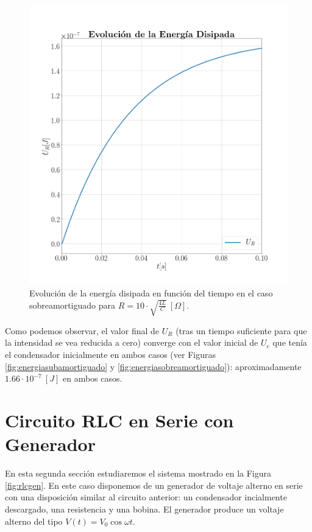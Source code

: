 \documentclass[journal]{IEEEtran}
\begin{document}
\begin{figure}[!htb]
    \centering
    \includegraphics[width=\linewidth,trim={40 70 70 70},clip]{energiadisipadasobreamortiguado.png}
    \caption{Evolución de la energía disipada en función del tiempo en el caso sobreamortiguado para $R=10 \cdot\sqrt{\frac{4L}{C}}~[\Omega]$.}
    \label{fig:energiadisipadasobreamortiguado}
\end{figure}

Como podemos observar, el valor final de $U_R$ (tras un tiempo suficiente para que la intensidad se vea reducida a cero) converge con el valor inicial de $U_e$ que tenía el condensador inicialmente en ambos casos (ver Figuras \ref{fig:energiasubamortiguado} y \ref{fig:energiasobreamortiguado}): aproximadamente $1.66\cdot 10^{-7}~[J]$ en ambos casos.

\newpage

\section{Circuito RLC en Serie con Generador}
\label{sec:rlccongenerador}

En esta segunda sección estudiaremos el sistema mostrado en la Figura \ref{fig:rlcgen}. En este caso disponemos de un generador de voltaje alterno en serie con una disposición similar al circuito anterior: un condensador incialmente descargado, una resistencia y una bobina. El generador produce un voltaje alterno del tipo $V(t) = V_0 \cos{\omega t}$.
\end{document}
